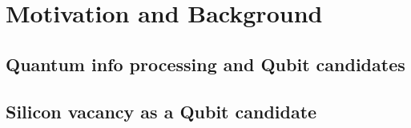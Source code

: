 
\chapter[Motivation and Background]
{Motivation and Background} %

\label{Chapter1} %







\newcommand{\keyword}[1]{\textbf{#1}}
\newcommand{\tabhead}[1]{\textbf{#1}}
\newcommand{\code}[1]{\texttt{#1}}
\newcommand{\file}[1]{\texttt{\bfseries#1}}
\newcommand{\option}[1]{\texttt{\itshape#1}}


\section[Quantum info processing and Qubit candidates]{Quantum info processing and Qubit candidates}



\section[Silicon vacancy as a Qubit candidate]{Silicon vacancy as a Qubit candidate}




